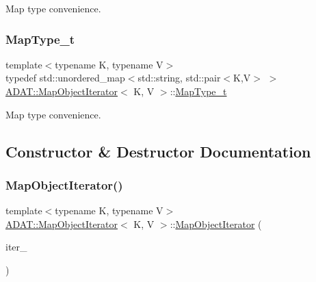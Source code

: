 Map type convenience. 

\mbox{\label{classADAT_1_1MapObjectIterator_ad159a70384669e35c10ddb298c4d1ba8}} 
\subsubsection{\texorpdfstring{MapType\_t}{MapType\_t}\hspace{0.1cm}{\footnotesize\ttfamily [2/2]}}
{\footnotesize\ttfamily template$<$typename K, typename V$>$ \\
typedef std\+::unordered\+\_\+map$<$std\+::string, std\+::pair$<$K,V$>$ $>$ \mbox{\hyperlink{classADAT_1_1MapObjectIterator}{A\+D\+A\+T\+::\+Map\+Object\+Iterator}}$<$ K, V $>$\+::\mbox{\hyperlink{classADAT_1_1MapObjectIterator_ad159a70384669e35c10ddb298c4d1ba8}{Map\+Type\+\_\+t}}}



Map type convenience. 



\subsection{Constructor \& Destructor Documentation}
\mbox{\label{classADAT_1_1MapObjectIterator_a2b23220f6791a2793bb16a898a515926}} 
\subsubsection{\texorpdfstring{MapObjectIterator()}{MapObjectIterator()}\hspace{0.1cm}{\footnotesize\ttfamily [1/4]}}
{\footnotesize\ttfamily template$<$typename K, typename V$>$ \\
\mbox{\hyperlink{classADAT_1_1MapObjectIterator}{A\+D\+A\+T\+::\+Map\+Object\+Iterator}}$<$ K, V $>$\+::\mbox{\hyperlink{classADAT_1_1MapObjectIterator}{Map\+Object\+Iterator}} (\begin{DoxyParamCaption}\item[{const typename Map\+Type\+\_\+t\+::const\+\_\+iterator \&}]{iter\+\_\+ }\end{DoxyParamCaption})\hspace{0.3cm}{\ttfamily [inline]}}



